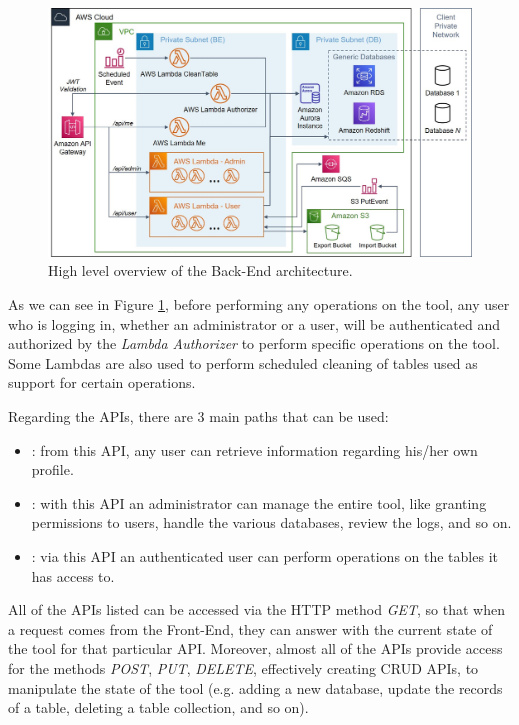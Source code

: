 \begin{figure}[!htb]
    \centering
    \includegraphics[width=15.8cm]{chapters/images/ch_3/BE_Common.jpg}
    \caption{High level overview of the Back-End architecture.}
    \label{fig:BE_Common}
\end{figure}

As we can see in Figure \ref{fig:BE_Common}, before performing any operations on the tool, any user who is logging in, whether an administrator or a user, will be authenticated and authorized by the \emph{Lambda Authorizer} to perform specific operations on the tool. Some Lambdas are also used to perform scheduled cleaning of tables used as support for certain operations.


Regarding the APIs, there are 3 main paths that can be used:
\begin{itemize}
    \item {}: from this API, any user can retrieve information regarding his/her own profile. 
    \item {}: with this API an administrator can manage the entire tool, like granting permissions to users, handle the various databases, review the logs, and so on.
    \item {}: via this API an authenticated user can perform operations on the tables it has access to.
\end{itemize}

All of the APIs listed can be accessed via the HTTP method \emph{GET}, so that when a request comes from the Front-End, they can answer with the current state of the tool for that particular API. Moreover, almost all of the APIs provide access for the methods \emph{POST}, \emph{PUT}, \emph{DELETE}, effectively creating CRUD APIs, to manipulate the state of the tool (e.g. adding a new database, update the records of a table, deleting a table collection, and so on).


